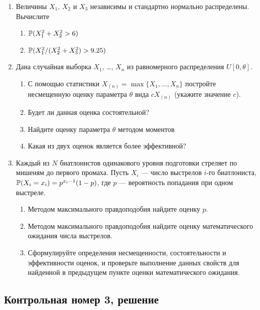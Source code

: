 \documentclass[12pt, a4paper]{article}\usepackage[]{graphicx}\usepackage[]{color}
\begin{document}
\begin{enumerate}
					\item Величины $X_1$, $X_2$ и $X_3$  независимы и стандартно нормально распределены. Вычислите
					\begin{enumerate}
						\item $\P(X_1^2 + X_2^2 > 6)$
						\item $\P(X_1^2 / (X_2^2 + X_3^2) > 9.25 )$
					\end{enumerate}

					\item Дана случайная выборка $X_1$, \ldots, $X_n$ из равномерного распределения $U[0, \theta]$.
					\begin{enumerate}
						\item  С помощью статистики $X_{(n)}=\max\{X_1, \ldots, X_n \}$ постройте несмещенную оценку параметра $\theta$  вида $cX_{(n)}$ (укажите значение $c$).
						\item Будет ли данная оценка состоятельной?
						\item Найдите оценку параметра $\theta$ методом моментов
						\item Какая из двух оценок является более эффективной?
					\end{enumerate}

					\item Каждый из $N$ биатлонистов одинакового уровня подготовки стреляет по мишеням до первого промаха.  Пусть $X_i$ — число выстрелов $i$-го биатлониста, $\P(X_i = x_i)=p^{x_i-1}(1-p)$, где $p$ — вероятность попадания при одном выстреле.
					\begin{enumerate}
						\item Методом максимального правдоподобия найдите оценку $p$.
						\item Методом максимального правдоподобия найдите оценку математического ожидания числа выстрелов.
						\item Сформулируйте определения несмещенности, состоятельности и эффективности  оценок, и проверьте выполнение данных свойств для найденной в предыдущем пункте оценки математического ожидания.
					\end{enumerate}


				\end{enumerate}


				\subsection{Контрольная номер 3, решение}
\end{document}
